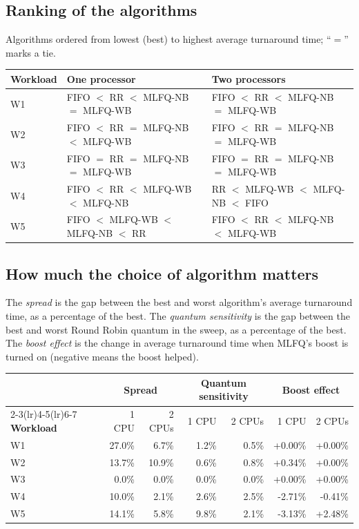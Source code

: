 \documentclass[11pt,a4paper]{article}
\begin{document}
\subsection{Ranking of the algorithms}

Algorithms ordered from lowest (best) to highest average turnaround time; ``$=$'' marks a
tie.

\begin{center}\small
\begin{tabular}{l>{\raggedright\arraybackslash}p{6.3cm}>{\raggedright\arraybackslash}p{6.3cm}}
\toprule
\textbf{Workload} & \textbf{One processor} & \textbf{Two processors}\\
\midrule
W1 & FIFO $<$ RR $<$ MLFQ-NB $=$ MLFQ-WB & FIFO $<$ RR $<$ MLFQ-NB $=$ MLFQ-WB \\
W2 & FIFO $<$ RR $=$ MLFQ-NB $<$ MLFQ-WB & FIFO $<$ RR $=$ MLFQ-NB $=$ MLFQ-WB \\
W3 & FIFO $=$ RR $=$ MLFQ-NB $=$ MLFQ-WB & FIFO $=$ RR $=$ MLFQ-NB $=$ MLFQ-WB \\
W4 & FIFO $<$ RR $<$ MLFQ-WB $<$ MLFQ-NB & RR $<$ MLFQ-WB $<$ MLFQ-NB $<$ FIFO \\
W5 & FIFO $<$ MLFQ-WB $<$ MLFQ-NB $<$ RR & FIFO $<$ RR $<$ MLFQ-NB $<$ MLFQ-WB \\
\bottomrule\end{tabular}\end{center}

\subsection{How much the choice of algorithm matters}

The \emph{spread} is the gap between the best and worst algorithm's average turnaround
time, as a percentage of the best. The \emph{quantum sensitivity} is the gap between the
best and worst Round Robin quantum in the sweep, as a percentage of the best. The
\emph{boost effect} is the change in average turnaround time when MLFQ's boost is turned
on (negative means the boost helped).

\begin{center}\small
\begin{tabular}{l rr rr rr}
\toprule
& \multicolumn{2}{c}{\textbf{Spread}} & \multicolumn{2}{c}{\textbf{Quantum sensitivity}} & \multicolumn{2}{c}{\textbf{Boost effect}}\\
\cmidrule(lr){2-3}\cmidrule(lr){4-5}\cmidrule(lr){6-7}
\textbf{Workload} & 1 CPU & 2 CPUs & 1 CPU & 2 CPUs & 1 CPU & 2 CPUs\\
\midrule
W1 & 27.0\% & 6.7\% & 1.2\% & 0.5\% & +0.00\% & +0.00\% \\
W2 & 13.7\% & 10.9\% & 0.6\% & 0.8\% & +0.34\% & +0.00\% \\
W3 & 0.0\% & 0.0\% & 0.0\% & 0.0\% & +0.00\% & +0.00\% \\
W4 & 10.0\% & 2.1\% & 2.6\% & 2.5\% & -2.71\% & -0.41\% \\
W5 & 14.1\% & 5.8\% & 9.8\% & 2.1\% & -3.13\% & +2.48\% \\
\bottomrule\end{tabular}\end{center}
\end{document}

